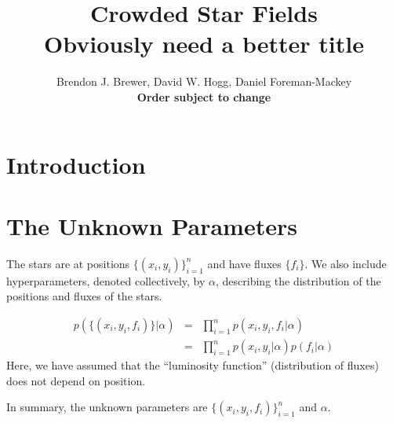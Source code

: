 \documentclass[letterpaper, 11pt]{article}
\title{Crowded Star Fields \\ \bf{Obviously need a better title}}
\author{Brendon J. Brewer, David W. Hogg, Daniel Foreman-Mackey \\ 
\bf{Order subject to change}}
\begin{document}
 \maketitle

\section{Introduction}

\section{The Unknown Parameters}
The stars are at positions $\{(x_i, 
y_i)\}_{i=1}^n$ and have fluxes $\{f_i\}$. We also include 
hyperparameters, denoted collectively, by $\alpha$, describing the 
distribution of the positions and fluxes of the stars.

\begin{eqnarray} 
p(\{(x_i, y_i, f_i)\} | \alpha) &=&
\prod_{i=1}^n p(x_i, y_i, f_i | \alpha) \\
&=& \prod_{i=1}^n p(x_i, y_i | \alpha)p(f_i | \alpha) 
\end{eqnarray}
Here, we have assumed that the ``luminosity function'' 
(distribution of fluxes) does not depend on position.

In summary, the unknown parameters are $\{(x_i, y_i, f_i)\}_{i=1}^n$
and $\alpha$.

\begin{thebibliography}{99} \end{thebibliography}
\end{document}

